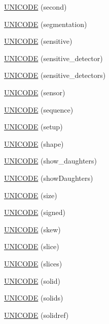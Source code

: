 \begin{DoxyCompactItemize}
\hyperlink{namespace_d_d4hep_1_1_x_m_l_a3093c361a4ebe4730215c79afec7b7ab}{UNICODE} (second)
\item 
\hyperlink{namespace_d_d4hep_1_1_x_m_l_a9c87e5f51620bde064e5301d0d7e8191}{UNICODE} (segmentation)
\item 
\hyperlink{namespace_d_d4hep_1_1_x_m_l_af887183aa9381edbe8e0c6e0d65d07c0}{UNICODE} (sensitive)
\item 
\hyperlink{namespace_d_d4hep_1_1_x_m_l_a9d2bf762671cf86615c9485017775a97}{UNICODE} (sensitive\_\-detector)
\item 
\hyperlink{namespace_d_d4hep_1_1_x_m_l_a032cb38ff12c06d77a6f79b3a6930311}{UNICODE} (sensitive\_\-detectors)
\item 
\hyperlink{namespace_d_d4hep_1_1_x_m_l_af87cf432f8b3a6489e2801dec68d6020}{UNICODE} (sensor)
\item 
\hyperlink{namespace_d_d4hep_1_1_x_m_l_a788e7ce3fe7109bef74e5559ca6ac729}{UNICODE} (sequence)
\item 
\hyperlink{namespace_d_d4hep_1_1_x_m_l_a1d527cd3b91e65b33b1844b463582be1}{UNICODE} (setup)
\item 
\hyperlink{namespace_d_d4hep_1_1_x_m_l_a5137168556c18b86cc92e527300bfa27}{UNICODE} (shape)
\item 
\hyperlink{namespace_d_d4hep_1_1_x_m_l_af733a40f814c74738f4496285f1a00dd}{UNICODE} (show\_\-daughters)
\item 
\hyperlink{namespace_d_d4hep_1_1_x_m_l_afb2e61ae1dd1d73ec60ea3845b99e007}{UNICODE} (showDaughters)
\item 
\hyperlink{namespace_d_d4hep_1_1_x_m_l_ace70b0cb76d08bc48373496df537353e}{UNICODE} (size)
\item 
\hyperlink{namespace_d_d4hep_1_1_x_m_l_a9e560f2beeeb45f725a1964a5e0193b7}{UNICODE} (signed)
\item 
\hyperlink{namespace_d_d4hep_1_1_x_m_l_aed0481c5dcc89b907fe4a4839ae6119c}{UNICODE} (skew)
\item 
\hyperlink{namespace_d_d4hep_1_1_x_m_l_a26275dae27ebc1e17a72ca0480bc5454}{UNICODE} (slice)
\item 
\hyperlink{namespace_d_d4hep_1_1_x_m_l_aeeedf7803729a82c7f281dd974fe0f02}{UNICODE} (slices)
\item 
\hyperlink{namespace_d_d4hep_1_1_x_m_l_aecb476f0abd293b4cca0971bee080f87}{UNICODE} (solid)
\item 
\hyperlink{namespace_d_d4hep_1_1_x_m_l_a9c65851ccd42927782350c218d8ec213}{UNICODE} (solids)
\item 
\hyperlink{namespace_d_d4hep_1_1_x_m_l_a0a1373a4600dfea2c5c6cc0ed52a64d5}{UNICODE} (solidref)

\end{DoxyCompactItemize}

